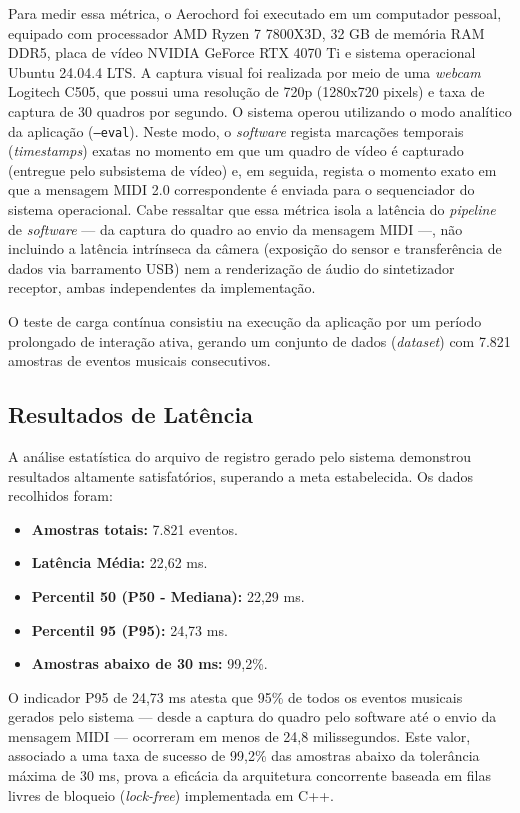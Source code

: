 Para medir essa métrica, o Aerochord foi executado em um computador pessoal, equipado com processador AMD Ryzen 7 7800X3D, 32 GB de memória RAM DDR5, placa de vídeo NVIDIA GeForce RTX 4070 Ti e sistema operacional Ubuntu 24.04.4 LTS. A captura visual foi realizada por meio de uma \textit{webcam} Logitech C505, que possui uma resolução de 720p (1280x720 pixels) e taxa de captura de 30 quadros por segundo. O sistema operou utilizando o modo analítico da aplicação (\texttt{--eval}). Neste modo, o \textit{software} regista marcações temporais (\textit{timestamps}) exatas no momento em que um quadro de vídeo é capturado (entregue pelo subsistema de vídeo) e, em seguida, regista o momento exato em que a mensagem MIDI 2.0 correspondente é enviada para o sequenciador do sistema operacional. Cabe ressaltar que essa métrica isola a latência do \textit{pipeline} de \textit{software} — da captura do quadro ao envio da mensagem MIDI —, não incluindo a latência intrínseca da câmera (exposição do sensor e transferência de dados via barramento USB) nem a renderização de áudio do sintetizador receptor, ambas independentes da implementação.

O teste de carga contínua consistiu na execução da aplicação por um período prolongado de interação ativa, gerando um conjunto de dados (\textit{dataset}) com 7.821 amostras de eventos musicais consecutivos.

\subsection{Resultados de Latência}
A análise estatística do arquivo de registro gerado pelo sistema demonstrou resultados altamente satisfatórios, superando a meta estabelecida. Os dados recolhidos foram:
\begin{itemize}
    \item \textbf{Amostras totais:} 7.821 eventos.
    \item \textbf{Latência Média:} 22,62 ms.
    \item \textbf{Percentil 50 (P50 - Mediana):} 22,29 ms.
    \item \textbf{Percentil 95 (P95):} 24,73 ms.
    \item \textbf{Amostras abaixo de 30 ms:} 99,2\%.
\end{itemize}

O indicador P95 de 24,73 ms atesta que 95\% de todos os eventos musicais gerados pelo sistema — desde a captura do quadro pelo software até o envio da mensagem MIDI — ocorreram em menos de 24,8 milissegundos. Este valor, associado a uma taxa de sucesso de 99,2\% das amostras abaixo da tolerância máxima de 30 ms, prova a eficácia da arquitetura concorrente baseada em filas livres de bloqueio (\textit{lock-free}) implementada em C++.


